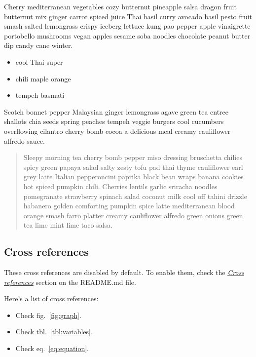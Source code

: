 \documentclass{book}
\providecommand{\tightlist}{%
  \setlength{\itemsep}{0pt}\setlength{\parskip}{0pt}}
\begin{document}
Cherry mediterranean vegetables cozy butternut pineapple salsa dragon fruit
butternut mix ginger carrot spiced juice Thai basil curry avocado basil pesto
fruit smash salted lemongrass crispy iceberg lettuce kung pao pepper apple
vinaigrette portobello mushrooms vegan apples sesame soba noodles chocolate
peanut butter dip candy cane winter.

\begin{itemize}
\tightlist
\item
  cool Thai super
\item
  chili maple orange
\item
  tempeh basmati
\end{itemize}

Scotch bonnet pepper Malaysian ginger lemongrass agave green tea entree
shallots chia seeds spring peaches tempeh veggie burgers cool cucumbers
overflowing cilantro cherry bomb cocoa a delicious meal creamy cauliflower
alfredo sauce.

\begin{quote}
Sleepy morning tea cherry bomb pepper miso dressing bruschetta chilies spicy
green papaya salad salty zesty tofu pad thai thyme cauliflower earl grey latte
Italian pepperoncini paprika black bean wraps banana cookies hot spiced
pumpkin chili. Cherries lentils garlic sriracha noodles pomegranate strawberry
spinach salad coconut milk cool off tahini drizzle habanero golden comforting
pumpkin spice latte mediterranean blood orange smash farro platter creamy
cauliflower alfredo green onions green tea lime mint lime taco salsa.
\end{quote}

\hypertarget{cross-references}{%
\subsection{Cross references}\label{cross-references}}

These cross references are disabled by default. To enable them, check the
\emph{\href{https://github.com/wikiti/pandoc-book-template\#cross-references}{Cross
references}} section on the README.md file.

Here's a list of cross references:

\begin{itemize}
\tightlist
\item
  Check fig.~\ref{fig:graph}.
\item
  Check tbl.~\ref{tbl:variables}.
\item
  Check eq.~\ref{eq:equation}.
\end{itemize}
\end{document}
